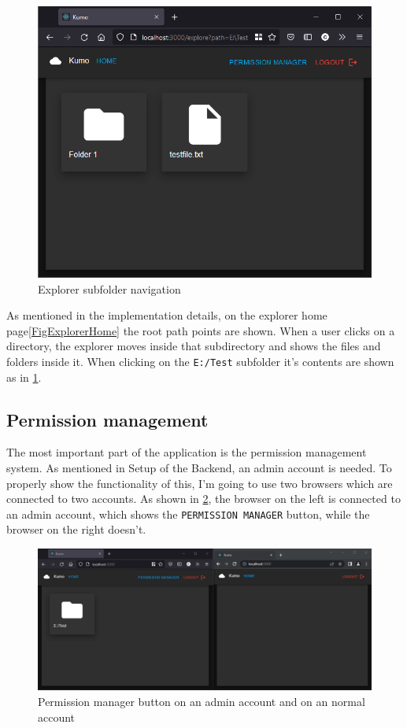 \begin{figure}[htbp]
	\centering
		\includegraphics[scale=0.65]{./figures/chapter4/explorer_subfolder.png}
	\caption{Explorer subfolder navigation}
	\label{FigExplorerSubFolder}
\end{figure}

As mentioned in the implementation details, on the explorer home page\ref{FigExplorerHome} the root path points are shown. When a user clicks on a directory, the explorer moves inside that subdirectory and shows the files and folders inside it. When clicking on the \verb|E:/Test| subfolder it's contents are shown as in \ref{FigExplorerSubFolder}.

\subsection{Permission management}
The most important part of the application is the permission management system. As mentioned in Setup of the Backend, an admin account is needed. To properly show the functionality of this, I'm going to use two browsers which are connected to two accounts. As shown in \ref{FigPermissionManagerButton}, the browser on the left is connected to an admin account, which shows the \verb|PERMISSION MANAGER| button, while the browser on the right doesn't.

\begin{figure}[htbp]
	\centering
		\includegraphics[scale=0.4]{./figures/chapter4/explorer_permission_manager.png}
	\caption{Permission manager button on an admin account and on an normal account}
	\label{FigPermissionManagerButton}
\end{figure}


